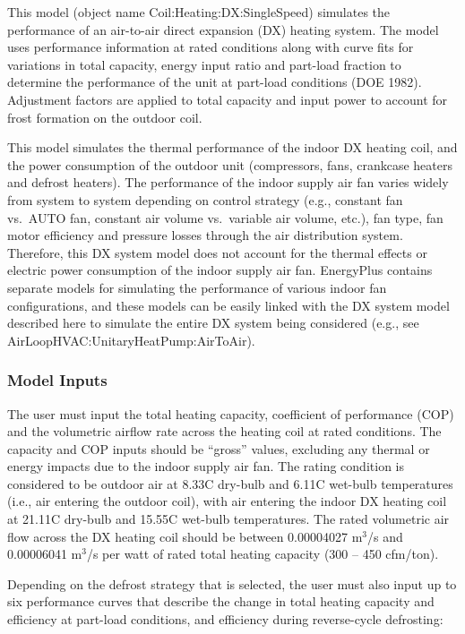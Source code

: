 This model (object name Coil:Heating:DX:SingleSpeed) simulates the performance of an air-to-air direct expansion (DX) heating system. The model uses performance information at rated conditions along with curve fits for variations in total capacity, energy input ratio and part-load fraction to determine the performance of the unit at part-load conditions (DOE 1982).~ Adjustment factors are applied to total capacity and input power to account for frost formation on the outdoor coil.

This model simulates the thermal performance of the indoor DX heating coil, and the power consumption of the outdoor unit (compressors, fans, crankcase heaters and defrost heaters). The performance of the indoor supply air fan varies widely from system to system depending on control strategy (e.g., constant fan vs.~AUTO fan, constant air volume vs.~variable air volume, etc.), fan type, fan motor efficiency and pressure losses through the air distribution system. Therefore, this DX system model does not account for the thermal effects or electric power consumption of the indoor supply air fan. EnergyPlus contains separate models for simulating the performance of various indoor fan configurations, and these models can be easily linked with the DX system model described here to simulate the entire DX system being considered (e.g., see AirLoopHVAC:UnitaryHeatPump:AirToAir).

\subsubsection{Model Inputs}\label{model-inputs-2}

The user must input the total heating capacity, coefficient of performance (COP) and the volumetric airflow rate across the heating coil at rated conditions. The capacity and COP inputs should be ``gross'' values, excluding any thermal or energy impacts due to the indoor supply air fan. The rating condition is considered to be outdoor air at 8.33C dry-bulb and 6.11C wet-bulb temperatures (i.e., air entering the outdoor coil), with air entering the indoor DX heating coil at 21.11C dry-bulb and 15.55C wet-bulb temperatures. The rated volumetric air flow across the DX heating coil should be between 0.00004027 m\(^{3}\)/s and 0.00006041 m\(^{3}\)/s per watt of rated total heating capacity (300 -- 450 cfm/ton).

Depending on the defrost strategy that is selected, the user must also input up to six performance curves that describe the change in total heating capacity and efficiency at part-load conditions, and efficiency during reverse-cycle defrosting:

